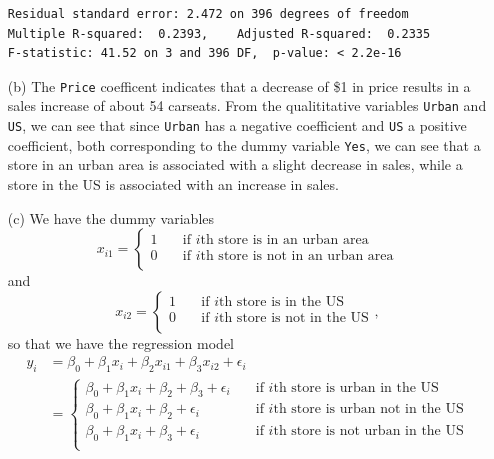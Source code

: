 \begin{itemize}
\begin{lstlisting}
Residual standard error: 2.472 on 396 degrees of freedom
Multiple R-squared:  0.2393,    Adjusted R-squared:  0.2335
F-statistic: 41.52 on 3 and 396 DF,  p-value: < 2.2e-16
        \end{lstlisting}
    \item[(b)] The \verb|Price| coefficent indicates that a decrease
        of \$1 in price
        results in a sales increase of about 54 carseats. From the qualititative
        variables \verb|Urban| and \verb|US|, we can see that since \verb|Urban|
        has a negative coefficient and \verb|US| a positive coefficient, both
        corresponding to the dummy variable \verb|Yes|, we can see that a store in
        an urban area is associated with a slight decrease in sales, while a store
        in the US is associated with an increase in sales.
    \item[(c)] We have the dummy variables
        \[
            x_{i1} =
            \begin{cases}
                1 \quad &\text{if $i$th store is in an urban area} \\
                0 \quad &\text{if $i$th store is not in an urban area} \\
            \end{cases}
        \]
        and
        \[
            x_{i2} =
            \begin{cases}
                1 \quad &\text{if $i$th store is in the US} \\
                0 \quad &\text{if $i$th store is not in the US} \\
            \end{cases},
        \]
        so that we have the regression model
        \begin{equation*}
            \begin{split}
                y_i &= \beta_0 + \beta_1 x_i + \beta_2 x_{i1} + \beta_3
                x_{i2} + \epsilon_i \\
                &=
                \begin{cases}
                    \beta_0 + \beta_1x_i + \beta_2 + \beta_3 + \epsilon_i \quad
                    &\text{if $i$th store is urban in the US} \\
                    \beta_0 + \beta_1x_i + \beta_2 + \epsilon_i \quad
                    &\text{if $i$th store is urban not in the US} \\
                    \beta_0 + \beta_1x_i + \beta_3 + \epsilon_i \quad
                    &\text{if $i$th store is not urban in the US} \\

\end{cases}
\end{split}
\end{equation*}
\end{itemize}
